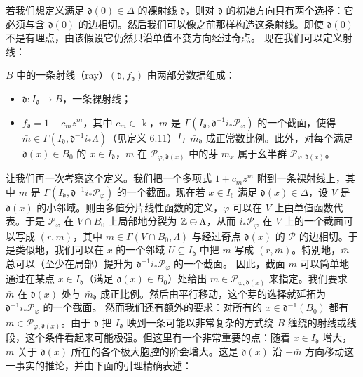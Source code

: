 若我们想定义满足 $\mathfrak{d}(0)\in\Delta$ 的裸射线 $\mathfrak{d}$，则对 $\mathfrak{d}$ 的初始方向只有两个选择：它必须与含 $\mathfrak{d}(0)$ 的边相切。然后我们可以像之前那样构造这条射线。即使 $\mathfrak{d}(0)$ 不是有理点，由该假设它仍然只沿单值不变方向经过奇点。
现在我们可以定义射线：

\begin{definition}
$B$ 中的一条射线（ray）$(\mathfrak{d},f_{\mathfrak{d}})$ 由两部分数据组成：
\begin{itemize}[leftmargin=2em]
\item $\mathfrak{d}:I_{\mathfrak{d}}\to B$，一条裸射线；
\item $f_{\mathfrak{d}}=1+c_mz^m$，其中 $c_m\in\Bbbk$，$m$ 是 $\Gamma(I_{\mathfrak{d}},\mathfrak{d}^{-1}i_*\mathcal{P}_\varphi)$ 的一个截面，使得 $\bar m\in\Gamma(I_{\mathfrak{d}},\mathfrak{d}^{-1}i_*\Lambda)$（见定义 6.11）与 $\bar m_{\mathfrak{d}}$ 成正常数比例。此外，对每个满足 $\mathfrak{d}(x)\in B_0$ 的 $x\in I_{\mathfrak{d}}$，$m$ 在 $\mathcal{P}_{\varphi,\mathfrak{d}(x)}$ 中的芽 $m_x$ 属于幺半群 $\mathcal{P}_{\varphi,\mathfrak{d}(x)}$。
\end{itemize}
\end{definition}

让我们再一次考察这个定义。我们把一个多项式 $1+c_mz^m$ 附到一条裸射线上，其中 $m$ 是 $\Gamma(I_{\mathfrak{d}},\mathfrak{d}^{-1}i_*\mathcal{P}_\varphi)$ 的一个截面。现在若 $x\in I_{\mathfrak{d}}$ 满足 $\mathfrak{d}(x)\in\Delta$，设 $V$ 是 $\mathfrak{d}(x)$ 的小邻域。则由多值分片线性函数的定义，$\varphi$ 可以在 $V$ 上由单值函数代表。于是 $\mathcal{P}_\varphi$ 在 $V\cap B_0$ 上局部地分裂为 $\mathbb{Z}\oplus\Lambda$，从而 $i_*\mathcal{P}_\varphi$ 在 $V$ 上的一个截面可以写成 $(r,\bar m)$，其中 $\bar m\in\Gamma(V\cap B_0,\Lambda)$ 与经过奇点 $\mathfrak{d}(x)$ 的 $\mathcal{P}$ 的边相切。于是类似地，我们可以在 $x$ 的一个邻域 $U\subseteq I_{\mathfrak{d}}$ 中把 $m$ 写成 $(r,\bar m)$。特别地，$\bar m$ 总可以（至少在局部）提升为 $\mathfrak{d}^{-1}i_*\mathcal{P}_\varphi$ 的一个截面。
因此，截面 $m$ 可以简单地通过在某点 $x\in I_{\mathfrak{d}}$（满足 $\mathfrak{d}(x)\in B_0$）处给出 $m\in\mathcal{P}_{\varphi,\mathfrak{d}(x)}$ 来指定。我们要求 $\bar m$ 在 $\mathfrak{d}(x)$ 处与 $\bar m_{\mathfrak{d}}$ 成正比例。然后由平行移动，这个芽的选择就延拓为 $\mathfrak{d}^{-1}i_*\mathcal{P}_\varphi$ 的一个截面。
然而我们还有额外的要求：对所有的 $x\in\mathfrak{d}^{-1}(B_0)$ 都有 $m\in\mathcal{P}_{\varphi,\mathfrak{d}(x)}$。由于 $\mathfrak{d}$ 把 $I_{\mathfrak{d}}$ 映到一条可能以非常复杂的方式绕 $B$ 缠绕的射线或线段，这个条件看起来可能极强。但这里有一个非常重要的点：随着 $x\in I_{\mathfrak{d}}$ 增大，$m$ 关于 $\mathfrak{d}(x)$ 所在的各个极大胞腔的阶会增大。这是 $\mathfrak{d}(x)$ 沿 $-\bar m$ 方向移动这一事实的推论，并由下面的引理精确表述：

